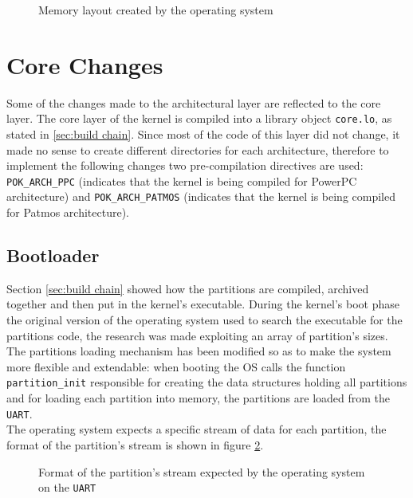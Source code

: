 	\begin{figure}[!ht]
		\begin{center}
		\end{center}
		\caption{Memory layout created by the operating system}
		\label{fig:memory layout}
	\end{figure}

\section{Core Changes}

Some of the changes made to the architectural layer are reflected to the core layer. The core layer of the kernel is compiled into a library object \texttt{core.lo}, as stated in \ref{sec:build chain}. Since most of the code of this layer did not change, it made no sense to create different directories for each architecture, therefore to implement the following changes two pre-compilation directives are used: \texttt{POK\_ARCH\_PPC} (indicates that the kernel is being compiled for PowerPC architecture) and \texttt{POK\_ARCH\_PATMOS} (indicates that the kernel is being compiled for Patmos architecture).

\subsection{Bootloader}

Section \ref{sec:build chain} showed how the partitions are compiled, archived together and then put in the kernel's executable. During the kernel's boot phase the original version of the operating system used to search the executable for the partitions code, the research was made exploiting an array of partition's sizes.\\

The partitions loading mechanism has been modified so as to make the system more flexible and extendable: when booting the OS calls the function \texttt{partition\_init} responsible for creating the data structures holding all partitions and for loading each partition into memory, the partitions are loaded from the \texttt{UART}.\\
The operating system expects a specific stream of data for each partition, the format of the partition's stream is shown in figure \ref{fig:partition stream format}.

	\begin{figure}[!ht]
		\begin{center}
		\end{center}
		\caption{Format of the partition's stream expected by the operating system on the \texttt{UART}}
		\label{fig:partition stream format}
	\end{figure}

